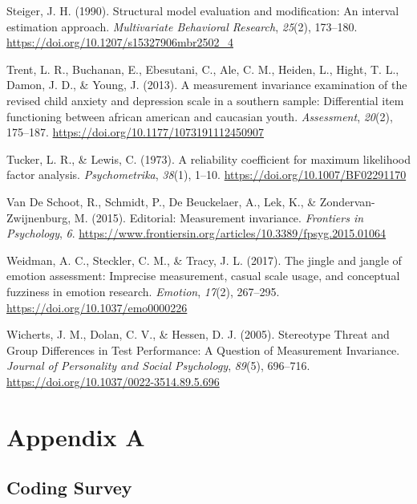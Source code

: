 \documentclass[
  english,
  man]{apa7}
\newlength{\cslhangindent}
\newenvironment{CSLReferences}[2] %
 {\begin{list}{}{%
  \setlength{\itemindent}{0pt}
  \setlength{\leftmargin}{0pt}
  \setlength{\parsep}{0pt}
  \ifodd #1
   \setlength{\leftmargin}{\cslhangindent}
   \setlength{\itemindent}{-1\cslhangindent}
  \fi
  \setlength{\itemsep}{#2\baselineskip}}}
 {\end{list}}
\begin{document}
\begin{CSLReferences}{1}{0}
Steiger, J. H. (1990). Structural model evaluation and modification: An interval estimation approach. \emph{Multivariate Behavioral Research}, \emph{25}(2), 173--180. \url{https://doi.org/10.1207/s15327906mbr2502_4}

Trent, L. R., Buchanan, E., Ebesutani, C., Ale, C. M., Heiden, L., Hight, T. L., Damon, J. D., \& Young, J. (2013). A measurement invariance examination of the revised child anxiety and depression scale in a southern sample: Differential item functioning between african american and caucasian youth. \emph{Assessment}, \emph{20}(2), 175--187. \url{https://doi.org/10.1177/1073191112450907}

Tucker, L. R., \& Lewis, C. (1973). A reliability coefficient for maximum likelihood factor analysis. \emph{Psychometrika}, \emph{38}(1), 1--10. \url{https://doi.org/10.1007/BF02291170}

Van De Schoot, R., Schmidt, P., De Beuckelaer, A., Lek, K., \& Zondervan-Zwijnenburg, M. (2015). Editorial: Measurement invariance. \emph{Frontiers in Psychology}, \emph{6}. \url{https://www.frontiersin.org/articles/10.3389/fpsyg.2015.01064}

Weidman, A. C., Steckler, C. M., \& Tracy, J. L. (2017). The jingle and jangle of emotion assessment: Imprecise measurement, casual scale usage, and conceptual fuzziness in emotion research. \emph{Emotion}, \emph{17}(2), 267--295. \url{https://doi.org/10.1037/emo0000226}

Wicherts, J. M., Dolan, C. V., \& Hessen, D. J. (2005). Stereotype Threat and Group Differences in Test Performance: A Question of Measurement Invariance. \emph{Journal of Personality and Social Psychology}, \emph{89}(5), 696--716. \url{https://doi.org/10.1037/0022-3514.89.5.696}

\end{CSLReferences}

\newpage

\appendix


\section{Appendix A}\label{appendix-a}

\subsection{Coding Survey}\label{coding-survey}
\end{document}
